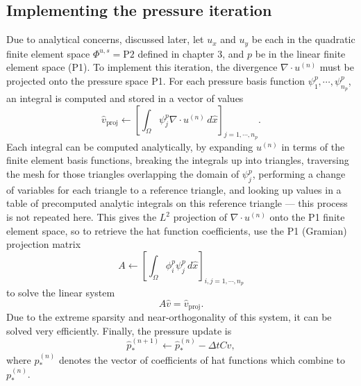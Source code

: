 \subsection{Implementing the pressure iteration}
Due to analytical concerns, discussed later, let $u_x$ and $u_y$ be each in the quadratic finite element space $\Phi^{u,s} = \text{P2}$ defined in chapter 3,
and $p$ be in the linear finite element space (P1).
To implement this iteration, the divergence $\nabla\cdot u^{(n)}$ must be projected onto the pressure space P1.
For each pressure basis function $\psi^p_1,\cdots,\psi^p_{n_p}$, an integral is computed and stored in a vector of values
$$
    \hat{v}_{\text{proj}} \leftarrow \left[\int_\Omega \psi^p_j \nabla\cdot u^{(n)}\,d\hat{x}\right]_{j=1,\cdots,n_p}.
$$
Each integral can be computed analytically, by expanding $u^{(n)}$ in terms of the finite element basis functions,
breaking the integrals up into triangles, traversing the mesh for those triangles overlapping the domain of $\psi^p_j$,
performing a change of variables for each triangle to a reference triangle,
and looking up values in a table of precomputed analytic integrals on this reference triangle --- this process is not repeated here.
This gives the $L^2$ projection of $\nabla\cdot u^{(n)}$ onto the P1 finite element space, so to retrieve the hat function coefficients,
use the P1 (Gramian) projection matrix
$$
    A \leftarrow \left[ \int_\Omega \phi^p_i\psi^p_j \,d\hat{x}\right]_{i,j=1,\cdots,n_p}
$$
to solve the linear system
$$
    A\hat{v} = \hat{v}_{\text{proj}}.
$$
Due to the extreme sparsity and near-orthogonality of this system, it can be solved very efficiently. Finally,
the pressure update is
$$
    \hat{p}_*^{(n+1)} \leftarrow \hat{p}_*^{(n)} - \Delta t C \hat{v},
$$
where $\hat{p}_*^{(n)}$ denotes the vector of coefficients of hat functions which combine to $p_*^{(n)}$.

\newpage
